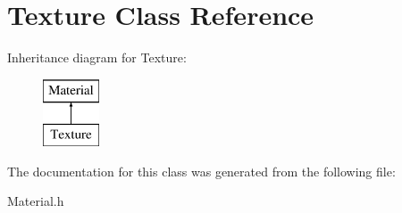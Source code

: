 \hypertarget{class_texture}{\section{Texture Class Reference}
\label{class_texture}
}
Inheritance diagram for Texture\-:\begin{figure}[H]
\begin{center}
\leavevmode
\includegraphics[height=2.000000cm]{class_texture}
\end{center}
\end{figure}


The documentation for this class was generated from the following file\-:\begin{DoxyCompactItemize}
\item 
Material.\-h\end{DoxyCompactItemize}
